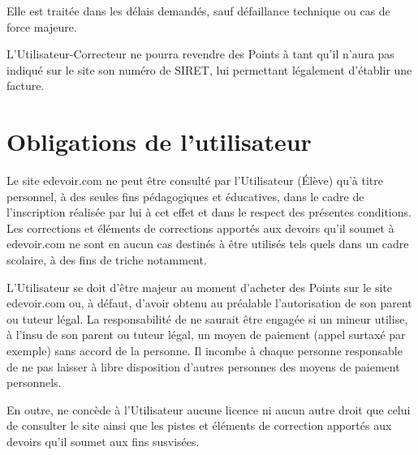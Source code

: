 Elle est traitée dans les délais demandés, sauf défaillance technique ou cas de force majeure.

L'Utilisateur-Correcteur ne pourra revendre des Points à \eDevoir tant qu'il n'aura pas indiqué sur le site son numéro de SIRET, lui permettant légalement d'établir une facture.


\section{Obligations de l'utilisateur}

Le site edevoir.com ne peut être consulté par l'Utilisateur (Élève) qu'à titre personnel, à des seules fins pédagogiques et éducatives, dans le cadre de l'inscription réalisée par lui à cet effet et dans le respect des présentes conditions. Les corrections et éléments de corrections apportés aux devoirs qu'il soumet à edevoir.com ne sont en aucun cas destinés à être utilisés tels quels dans un cadre scolaire, à des fins de triche notamment.

L'Utilisateur se doit d'être majeur au moment d'acheter des Points sur le site edevoir.com ou, à défaut, d'avoir obtenu au préalable l'autorisation de son parent ou tuteur légal. La responsabilité de \eDevoir ne saurait être engagée si un mineur utilise, à l'insu de son parent ou tuteur légal, un moyen de paiement (appel surtaxé par exemple) sans accord de la personne. Il incombe à chaque personne responsable de ne pas laisser à libre disposition d'autres personnes des moyens de paiement personnels.

En outre, \eDevoir ne concède à l'Utilisateur aucune licence ni aucun autre droit que celui de consulter le site ainsi que les pistes et éléments de correction apportés aux devoirs qu'il soumet aux fins susvisées.

